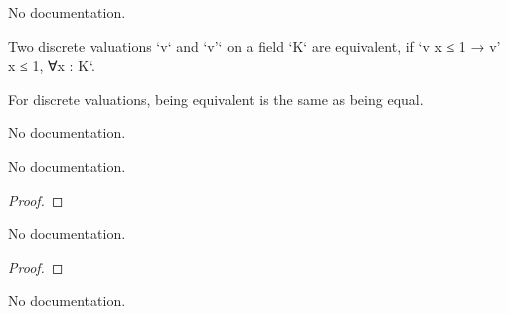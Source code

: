 \begin{theorem}\label{lt_one_lt_one_of_le_one_le_one}
                No documentation.
    \end{theorem}

\begin{theorem}\label{isEquiv_of_le_one_le_one}
                Two discrete valuations `v` and `v'` on a field `K` are equivalent, if `v x ≤ 1 → v' x ≤ 1, ∀x : K`.
    \end{theorem}

\begin{theorem}\label{isEquiv_iff_eq}
                For discrete valuations, being equivalent is the same as being equal.
    \end{theorem}

\begin{definition}\label{Valuation.Nontrivial}
        \leanok
                No documentation.
    \end{definition}

\begin{theorem}\label{Valuation.nontrivial_def}
        \leanok
                No documentation.
    \end{theorem}

\begin{proof}
    \leanok
\end{proof}

\begin{theorem}\label{DiscreteValuation.valuationSubring_DVR_of_equiv_discrete}
        \leanok
                No documentation.
    \end{theorem}

\begin{proof}
    \leanok
\end{proof}

\begin{definition}\label{DiscreteValuation.ofNontrivial}
                No documentation.
    \end{definition}

